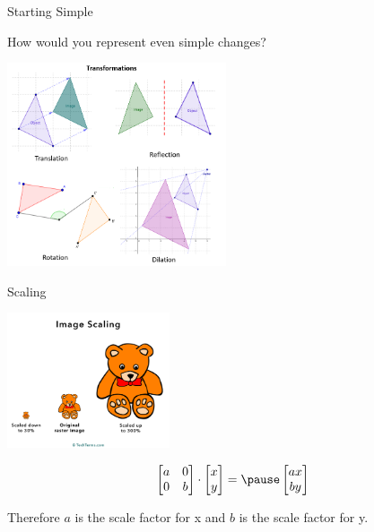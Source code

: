 \documentclass{beamer}
\begin{document}
\begin{frame}{Starting Simple}

  How would you represent even simple changes?

  \vspace{5mm}

  \begin{center}
    \includegraphics[height=6cm]{transformations}
  \end{center}

\end{frame}

\begin{frame}{Scaling}

  \begin{center}
    \includegraphics[height=4cm]{scale}
  \end{center} \pause


  \[
    \begin{bmatrix}
      a & 0 \\
      0 & b
    \end{bmatrix}
    \cdot
    \begin{bmatrix}
      x \\ y
    \end{bmatrix}
    = \pause
    \begin{bmatrix}
      ax \\ by
    \end{bmatrix}
  \]
  \pause

  Therefore $a$ is the scale factor for x and $b$ is the scale factor for y.

\end{frame}
\end{document}
